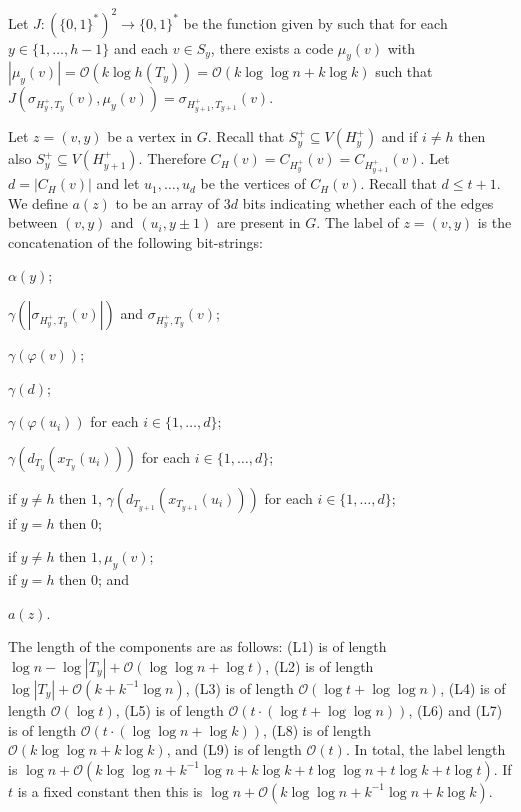 \documentclass[kpfonts]{patmorin}
\newcommand{\snote}[1]{\fcolorbox{red}{yellow}{#1}}
\newcommand{\Oh}{\mathcal{O}}
\let\leq\leqslant
\begin{document}
Let $J:(\{0,1\}^{*})^2\to\{0,1\}^*$ be the function given by  such that
for each $y\in\{1,\ldots,h-1\}$ and each $v\in S_{y}$,
there exists a code $\mu_{y}(v)$ with $|\mu_{y}(v)|=\Oh(k\log h(T_{y}))=\Oh(k\log\log n+k \log k)$ such that $J(\sigma_{H^+_y,T_{y}}(v),\mu_{y}(v))=\sigma_{H^+_{y+1},T_{y+1}}(v)$.


Let $z=(v,y)$ be a vertex in $G$. 
Recall that $S^+_y \subseteq V(H^+_y)$ and if $i\neq h$ then also $S^+_y\subseteq V(H^+_{y+1})$. 
Therefore 
$C_{H}(v) = C_{H^+_y}(v) = C_{H^+_{y+1}}(v)$.
Let $d = |C_{H}(v)|$ and let $u_1,\ldots,u_d$ be the vertices of $C_H(v)$. 
Recall that $d\leq t+1$.
We define $a(z)$ to be an array of $3d$ bits indicating whether 
each of the edges between $(v,y)$ and $(u_i,y\pm1)$ are present in $G$. 
The label of $z=(v,y)$ is the concatenation of the following bit-strings:

\begin{compactenum}[(L1)]
  \item\label{label-alpha} $\alpha(y)$;%
  \item $\gamma(|\sigma_{H^+_y,T_y}(v)|)$ and $\sigma_{H^+_y,T_y}(v)$; %
  \item $\gamma(\varphi(v))$;
  \item $\gamma(d)$;
  \item $\gamma(\varphi(u_i))$ for each $i\in\{1,\ldots,d\}$;
  \item $\gamma(d_{T_{y}}(x_{T_{y}}(u_i)))$ for each $i\in\{1,\ldots,d\}$;
  \item 
  if $y\neq h$ then $1$, $\gamma(d_{T_{y+1}}(x_{T_{y+1}}(u_i)))$ for each $i\in\{1,\ldots,d\}$;\\
  if $y=h$ then $0$;
  \item 
  if $y\neq h$ then $1,\mu_y(v)$;\\
  if $y=h$ then $0$; and
  \item $a(z)$.
  \end{compactenum}
The length of the components are as follows: 
(L1) is of length $\log n -\log|T_y| + \Oh(\log\log n + \log t)$, 
(L2) is of length $\log|T_y| + \Oh(k+k^{-1}\log n)$, 
(L3) is of length $\Oh(\log t + \log\log n)$,
(L4) is of length $\Oh(\log t)$, 
(L5) is of length $\Oh(t\cdot (\log t + \log\log n))$, 
(L6) and (L7) is of length $\Oh(t\cdot (\log\log n + \log k))$,
(L8) is of length $\Oh(k\log\log n + k\log k)$, and 
(L9) is of length $\Oh(t)$.
In total, the label length is $\log n + \Oh(k\log\log n+k^{-1}\log n + k\log k + t \log\log n + t \log k + t \log t)$.
If $t$ is a fixed constant then this is  
$\log n + \Oh(k\log\log n+k^{-1}\log n + k\log k)$.
\end{document}
